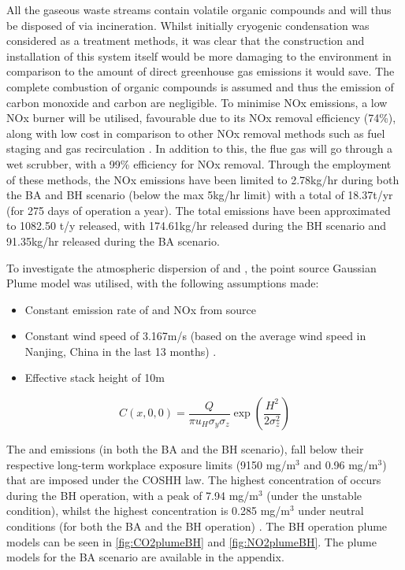 All the gaseous waste 
streams contain volatile organic compounds and will thus be disposed of via incineration. Whilst initially cryogenic condensation was considered as a treatment methods, it was clear that the construction and installation of this system itself would be more damaging to the environment in comparison to the amount of direct greenhouse gas emissions it would save. The complete combustion of organic compounds is assumed and thus the emission of carbon monoxide and carbon are negligible. To minimise NOx emissions, a low NOx burner will be utilised, favourable due to its NOx removal efficiency (74\%), along with low cost in comparison to other NOx removal methods such as fuel staging and gas recirculation \cite{world_bank_group_pollution_1999}. In addition to this, the flue gas will go through a wet scrubber, with a 99\% efficiency for NOx removal. Through the employment of these methods, the NOx emissions have been limited to 2.78kg/hr during both the BA and BH scenario (below the max 5kg/hr limit) with a total of 18.37t/yr (for 275 days of operation a year). The total  emissions have been approximated to 1082.50 t/y released, with 174.61kg/hr released during the BH scenario and 91.35kg/hr released during the BA scenario. 

To investigate the atmospheric dispersion of  and , the point source Gaussian Plume model was utilised, with the following assumptions made:

\begin{itemize}
\item Constant emission rate of  and NOx from source
\item Constant wind speed of 3.167m/s (based on the average wind speed in Nanjing, China in the last 13 months) \cite{worldweatheronline_nanjing_nodate}.  
\item  Effective stack height of 10m 
\end{itemize}

\begin{equation}
C(x,0,0)= \frac{Q}{\pi u_{H} \sigma_{y} \sigma_{z}} \exp\left( \frac{H^2}{2\sigma_{z}^2}\right)
\end{equation}


The  and  emissions (in both the BA and the BH scenario), fall below their respective long-term workplace exposure limits (9150 mg/m$^3$ and 0.96 mg/m$^3$) that are imposed under the COSHH law. The highest concentration of  occurs during the BH operation, with a peak of 7.94 mg/m$^3$  (under the unstable condition), whilst the highest  concentration is 0.285 mg/m$^3$ under neutral conditions (for both the BA and the BH operation) \cite{great_britain_health_and_safety_executive_workplace_2020}. The BH operation plume models can be seen in \ref{fig:CO2plumeBH} and \ref{fig:NO2plumeBH}. The plume models for the BA scenario are available in the appendix. 


